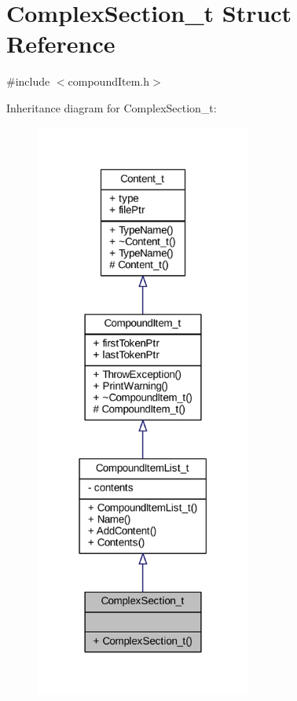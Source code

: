 \hypertarget{struct_complex_section__t}{}\section{Complex\+Section\+\_\+t Struct Reference}
\label{struct_complex_section__t}


{\ttfamily \#include $<$compound\+Item.\+h$>$}



Inheritance diagram for Complex\+Section\+\_\+t\+:
\nopagebreak
\begin{figure}[H]
\begin{center}
\leavevmode
\includegraphics[width=201pt]{struct_complex_section__t__inherit__graph}
\end{center}
\end{figure}


